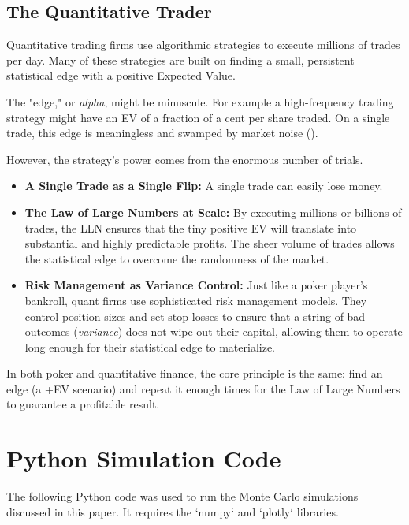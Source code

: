 \documentclass[12pt]{article}
\begin{document}
\subsection{The Quantitative Trader}
Quantitative trading firms use algorithmic strategies to execute millions of trades per day. Many of these strategies are built on finding a small, persistent statistical edge with a positive Expected Value.

The "edge," or \textit{alpha}, might be minuscule. For example a high-frequency trading strategy might have an EV of a fraction of a cent per share traded. On a single trade, this edge is meaningless and swamped by market noise ().

However, the strategy's power comes from the enormous number of trials.
\begin{itemize}
    \item \textbf{A Single Trade as a Single Flip:} A single trade can easily lose money.
    \item \textbf{The Law of Large Numbers at Scale:} By executing millions or billions of trades, the LLN ensures that the tiny positive EV will translate into substantial and highly predictable profits. The sheer volume of trades allows the statistical edge to overcome the randomness of the market.
    \item \textbf{Risk Management as Variance Control:} Just like a poker player's bankroll, quant firms use sophisticated risk management models. They control position sizes and set stop-losses to ensure that a string of bad outcomes (\textit{variance}) does not wipe out their capital, allowing them to operate long enough for their statistical edge to materialize.
\end{itemize}

In both poker and quantitative finance, the core principle is the same: find an edge (a +EV scenario) and repeat it enough times for the Law of Large Numbers to guarantee a profitable result.


\clearpage
\appendix
\section{Python Simulation Code}

The following Python code was used to run the Monte Carlo simulations discussed in this paper. It requires the `numpy` and `plotly` libraries.
\end{document}

